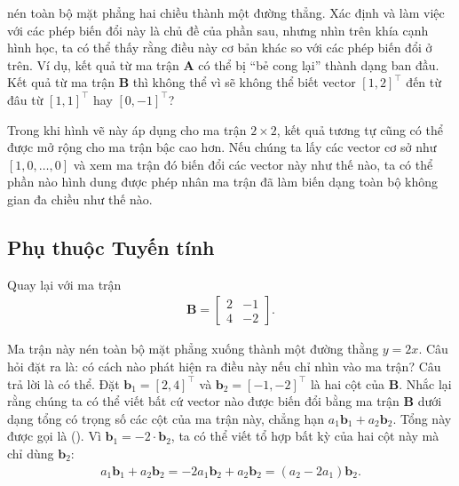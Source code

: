 \documentclass[letterpaper,11pt,english]{sphinxmanual}
\begin{document}
nén toàn bộ mặt phẳng hai chiều thành một đường thẳng. Xác định và làm
việc với các phép biến đổi này là chủ đề của phần sau, nhưng nhìn trên
khía cạnh hình học, ta có thể thấy rằng điều này cơ bản khác so với các
phép biến đổi ở trên. Ví dụ, kết quả từ ma trận \(\mathbf{A}\) có
thể bị “bẻ cong lại” thành dạng ban đầu. Kết quả từ ma trận
\(\mathbf{B}\) thì không thể vì sẽ không thể biết vector
\([1,2]^\top\) đến từ đâu \textendash{} từ \([1,1]^\top\) hay
\([0, -1]^\top\)?



Trong khi hình vẽ này áp dụng cho ma trận \(2\times2\), kết quả
tương tự cũng có thể được mở rộng cho ma trận bậc cao hơn. Nếu chúng ta
lấy các vector cơ sở như \([1,0, \ldots,0]\) và xem ma trận đó biến
đổi các vector này như thế nào, ta có thể phần nào hình dung được phép
nhân ma trận đã làm biến dạng toàn bộ không gian đa chiều như thế nào.








\subsection{Phụ thuộc Tuyến tính}
\label{\detokenize{chapter_appendix_math/geometry-linear-algebric-ops_vn:phu-thuoc-tuyen-tinh}}


Quay lại với ma trận
\begin{equation}\label{equation:chapter_appendix_math/geometry-linear-algebric-ops_vn:chapter_appendix_math/geometry-linear-algebric-ops_vn:12}
\begin{split}\mathbf{B} = \begin{bmatrix}
2 & -1 \\ 4 & -2
\end{bmatrix}.\end{split}
\end{equation}


Ma trận này nén toàn bộ mặt phẳng xuống thành một đường thằng
\(y = 2x\). Câu hỏi đặt ra là: có cách nào phát hiện ra điều này nếu
chỉ nhìn vào ma trận? Câu trả lời là có thể. Đặt
\(\mathbf{b}_1 = [2,4]^\top\) và
\(\mathbf{b}_2 = [-1, -2]^\top\) là hai cột của \(\mathbf{B}\).
Nhắc lại rằng chúng ta có thể viết bất cứ vector nào được biến đổi bằng
ma trận \(\mathbf{B}\) dưới dạng tổng có trọng số các cột của ma
trận này, chẳng hạn \(a_1\mathbf{b}_1 + a_2\mathbf{b}_2\). Tổng này
được gọi là  (). Vì
\(\mathbf{b}_1 = -2\cdot\mathbf{b}_2\), ta có thể viết tổ hợp bất kỳ
của hai cột này mà chỉ dùng \(\mathbf{b}_2\):
\begin{equation}\label{equation:chapter_appendix_math/geometry-linear-algebric-ops_vn:chapter_appendix_math/geometry-linear-algebric-ops_vn:13}
\begin{split}a_1\mathbf{b}_1 + a_2\mathbf{b}_2 = -2a_1\mathbf{b}_2 + a_2\mathbf{b}_2 = (a_2-2a_1)\mathbf{b}_2.\end{split}
\end{equation}
\end{document}
